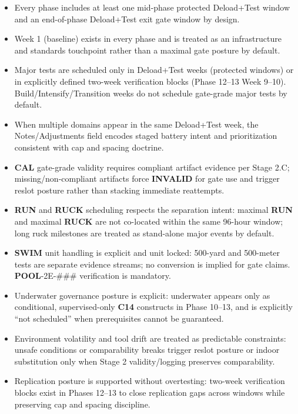 \documentclass[10pt]{article}
\begin{document}
\begin{itemize}
\item Every phase includes at least one mid-phase protected Deload+Test window and an end-of-phase Deload+Test exit gate window by design.
\item Week 1 (baseline) exists in every phase and is treated as an infrastructure and standards touchpoint rather than a maximal gate posture by default.
\item Major tests are scheduled only in Deload+Test weeks (protected windows) or in explicitly defined two-week verification blocks (Phase 12–13 Week 9–10). Build/Intensify/Transition weeks do not schedule gate-grade major tests by default.
\item When multiple domains appear in the same Deload+Test week, the Notes/Adjustments field encodes staged battery intent and prioritization consistent with cap and spacing doctrine.
\item \textbf{CAL} gate-grade validity requires compliant artifact evidence per Stage 2.C; missing/non-compliant artifacts force \textbf{INVALID} for gate use and trigger reslot posture rather than stacking immediate reattempts.
\item \textbf{RUN} and \textbf{RUCK} scheduling respects the separation intent: maximal \textbf{RUN} and maximal \textbf{RUCK} are not co-located within the same 96-hour window; long ruck milestones are treated as stand-alone major events by default.
\item \textbf{SWIM} unit handling is explicit and unit locked: 500-yard and 500-meter tests are separate evidence streams; no conversion is implied for gate claims. \textbf{POOL}-2E-\#\#\# verification is mandatory.
\item Underwater governance posture is explicit: underwater appears only as conditional, supervised-only \textbf{C14} constructs in Phase 10–13, and is explicitly “not scheduled” when prerequisites cannot be guaranteed.
\item Environment volatility and tool drift are treated as predictable constraints: unsafe conditions or comparability breaks trigger reslot posture or indoor substitution only when Stage 2 validity/logging preserves comparability.
\item Replication posture is supported without overtesting: two-week verification blocks exist in Phases 12–13 to close replication gaps across windows while preserving cap and spacing discipline.
\end{itemize}
\end{document}
